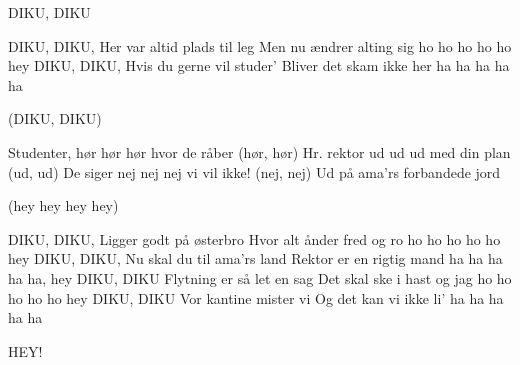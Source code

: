 \documentclass[a4paper,11pt]{article}
\begin{document}
\begin{song}
DIKU, DIKU

DIKU, DIKU,
Her var altid plads til leg
Men nu ændrer alting sig
ho ho ho ho ho hey
DIKU, DIKU,
Hvis du gerne vil studer'
Bliver det skam ikke her
ha ha ha ha ha

 (DIKU, DIKU)

 Studenter, hør hør hør hvor de råber (hør, hør)
Hr. rektor ud ud ud med din plan (ud, ud)
 De siger nej nej nej vi vil ikke! (nej, nej)
 Ud på ama'rs forbandede jord

 (hey hey hey hey)

DIKU, DIKU,
Ligger godt på østerbro
Hvor alt ånder fred og ro
ho ho ho ho ho hey
DIKU, DIKU,
Nu skal du til ama'rs land
Rektor er en rigtig mand
ha ha ha ha ha, hey
DIKU, DIKU
Flytning er så let en sag
Det skal ske i hast og jag
ho ho ho ho ho hey
DIKU, DIKU
Vor kantine mister vi
Og det kan vi ikke li'
ha ha ha ha ha

HEY!
\end{song}
\end{document}
